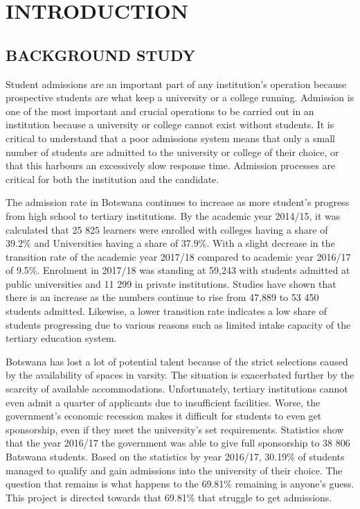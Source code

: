 \chapter{INTRODUCTION}

\section{BACKGROUND STUDY}
Student admissions are an important part of any institution's operation because prospective students are what keep a university or a college running. Admission is one of the most important and crucial operations to be carried out in an institution because a university or college cannot exist without students. It is critical to understand that a poor admissions system means that only a small number of students are admitted to the university or college of their choice, or that this harbours an excessively slow response time. Admission processes are critical for both the institution and the candidate.

The admission rate in Botswana continues to increase as more student’s progress from high school to tertiary institutions. By the academic year 2014/15, it was calculated that 25 825 learners were enrolled with colleges having a share of 39.2\% and Universities having a share of 37.9\%. With a slight decrease in the transition rate of the academic year 2017/18 compared to academic year 2016/17 of 9.5\%. Enrolment in 2017/18 was standing at 59,243 with students admitted at public universities and 11 299 in private institutions. Studies have shown that there is an increase as the numbers continue to rise from 47,889 to 53 450 students admitted. Likewise, a lower transition rate indicates a low share of students progressing due to various reasons such as limited intake capacity of the tertiary education system.\cite{}

Botswana has lost a lot of potential talent because of the strict selections caused by the availability of spaces in varsity. The situation is exacerbated further by the scarcity of available accommodations. Unfortunately, tertiary institutions cannot even admit a quarter of applicants due to insufficient facilities. Worse, the government's economic recession makes it difficult for students to even get sponsorship, even if they meet the university's set requirements. Statistics show that the year 2016/17 the government was able to give full sponsorship to 38 806 Batswana students. Based on the statistics by year 2016/17, 30.19\% of students managed to qualify and gain admissions into the university of their choice. The question that remains is what happens to the 69.81\% remaining is anyone’s guess. This project is directed towards that 69.81\% that struggle to get admissions.\cite{}

